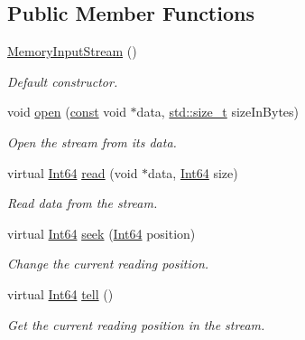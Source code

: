 \subsection*{Public Member Functions}
\begin{DoxyCompactItemize}
\item 
\hyperlink{classsf_1_1_memory_input_stream_a2d78851a69a8956a79872be41bcdfe0e}{Memory\-Input\-Stream} ()
\begin{DoxyCompactList}\small\item\em Default constructor. \end{DoxyCompactList}\item 
void \hyperlink{classsf_1_1_memory_input_stream_ad3cfb4f4f915f7803d6a0784e394ac19}{open} (\hyperlink{term__entry_8h_a57bd63ce7f9a353488880e3de6692d5a}{const} void $\ast$data, \hyperlink{nc__alloc_8h_a7b60c5629e55e8ec87a4547dd4abced4}{std\-::size\-\_\-t} size\-In\-Bytes)
\begin{DoxyCompactList}\small\item\em Open the stream from its data. \end{DoxyCompactList}\item 
virtual \hyperlink{namespacesf_a2840579fed3494d9f330baf7a5a19903}{Int64} \hyperlink{classsf_1_1_memory_input_stream_adff5270c521819639154d42d76fd4c34}{read} (void $\ast$data, \hyperlink{namespacesf_a2840579fed3494d9f330baf7a5a19903}{Int64} size)
\begin{DoxyCompactList}\small\item\em Read data from the stream. \end{DoxyCompactList}\item 
virtual \hyperlink{namespacesf_a2840579fed3494d9f330baf7a5a19903}{Int64} \hyperlink{classsf_1_1_memory_input_stream_aa2ac8fda2bdb4c95248ae90c71633034}{seek} (\hyperlink{namespacesf_a2840579fed3494d9f330baf7a5a19903}{Int64} position)
\begin{DoxyCompactList}\small\item\em Change the current reading position. \end{DoxyCompactList}\item 
virtual \hyperlink{namespacesf_a2840579fed3494d9f330baf7a5a19903}{Int64} \hyperlink{classsf_1_1_memory_input_stream_a7ad4bdf721f29de8f66421ff29e23ee4}{tell} ()
\begin{DoxyCompactList}\small\item\em Get the current reading position in the stream. \end{DoxyCompactList}\item 

\end{DoxyCompactItemize}
